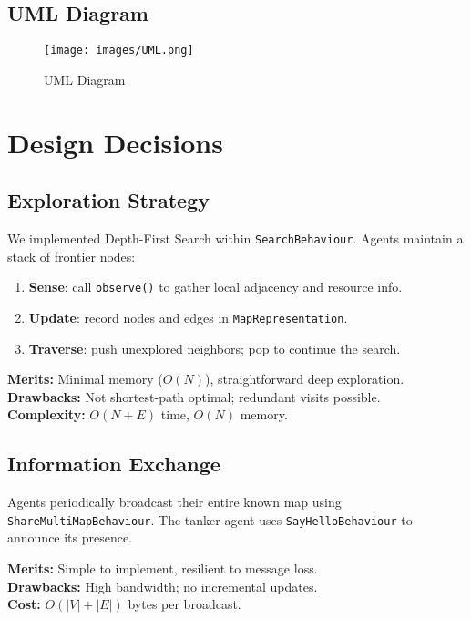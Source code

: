 \documentclass[a4paper, 12pt]{report}
\begin{document}
\subsection{UML Diagram}
\begin{figure}[H]
        \centering
        \texttt{[image: images/UML.png]}
        \caption{UML Diagram}
\end{figure}

\section{Design Decisions}

\subsection{Exploration Strategy}
We implemented Depth-First Search within \texttt{SearchBehaviour}. Agents maintain a stack of frontier nodes:
\begin{enumerate}
  \item \textbf{Sense}: call \texttt{observe()} to gather local adjacency and resource info.
  \item \textbf{Update}: record nodes and edges in \texttt{MapRepresentation}.
  \item \textbf{Traverse}: push unexplored neighbors; pop to continue the search.
\end{enumerate}

\textbf{Merits:} Minimal memory ($O(N)$), straightforward deep exploration.\\
\textbf{Drawbacks:} Not shortest-path optimal; redundant visits possible.\\
\textbf{Complexity:} $O(N+E)$ time, $O(N)$ memory.

\subsection{Information Exchange}
Agents periodically broadcast their entire known map using \texttt{ShareMultiMapBehaviour}. The tanker agent uses \texttt{SayHelloBehaviour} to announce its presence.

\textbf{Merits:} Simple to implement, resilient to message loss.\\
\textbf{Drawbacks:} High bandwidth; no incremental updates.\\
\textbf{Cost:} $O(|V|+|E|)$ bytes per broadcast.
\end{document}

